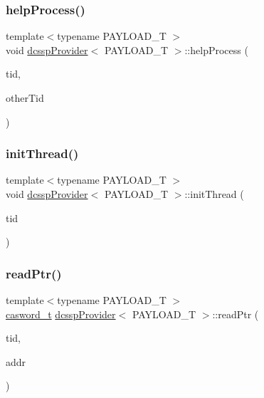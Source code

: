 \subsubsection{\texorpdfstring{help\+Process()}{helpProcess()}}
{\footnotesize\ttfamily template$<$typename P\+A\+Y\+L\+O\+A\+D\+\_\+T $>$ \\
void \hyperlink{classdcsspProvider}{dcssp\+Provider}$<$ P\+A\+Y\+L\+O\+A\+D\+\_\+T $>$\+::help\+Process (\begin{DoxyParamCaption}\item[{const int}]{tid,  }\item[{const int}]{other\+Tid }\end{DoxyParamCaption})\hspace{0.3cm}{\ttfamily [inline]}}

\mbox{\label{classdcsspProvider_aa6bd49afcdbc6175d3f2ae125a37e568}} 
\subsubsection{\texorpdfstring{init\+Thread()}{initThread()}}
{\footnotesize\ttfamily template$<$typename P\+A\+Y\+L\+O\+A\+D\+\_\+T $>$ \\
void \hyperlink{classdcsspProvider}{dcssp\+Provider}$<$ P\+A\+Y\+L\+O\+A\+D\+\_\+T $>$\+::init\+Thread (\begin{DoxyParamCaption}\item[{const int}]{tid }\end{DoxyParamCaption})}

\mbox{\label{classdcsspProvider_a05815f2c3c9d57e21e04ba4343ef8b2c}} 
\subsubsection{\texorpdfstring{read\+Ptr()}{readPtr()}}
{\footnotesize\ttfamily template$<$typename P\+A\+Y\+L\+O\+A\+D\+\_\+T $>$ \\
\hyperlink{rq__unsafe_8h_ad45142aaf2ff20a036dc6242b8483e9c}{casword\+\_\+t} \hyperlink{classdcsspProvider}{dcssp\+Provider}$<$ P\+A\+Y\+L\+O\+A\+D\+\_\+T $>$\+::read\+Ptr (\begin{DoxyParamCaption}\item[{const int}]{tid,  }\item[{\hyperlink{rq__unsafe_8h_ad45142aaf2ff20a036dc6242b8483e9c}{casword\+\_\+t} volatile $\ast$}]{addr }\end{DoxyParamCaption})}

